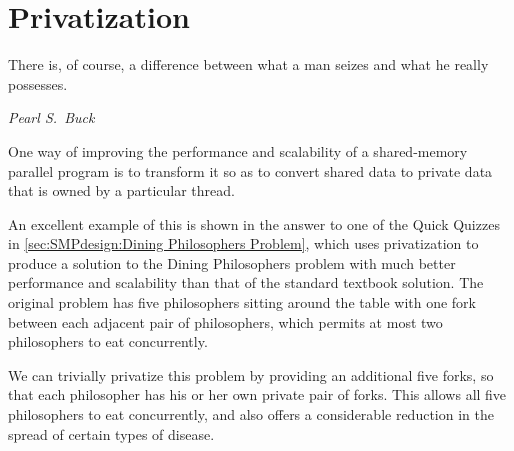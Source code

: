 \QuickQuizEnd

\section{Privatization}
\label{sec:owned:Privatization}
%
\epigraph{There is, of course, a difference between what a man seizes
	  and what he really possesses.}
	 {\emph{Pearl S.~Buck}}

One way of improving the performance and scalability of a shared-memory
parallel program is to transform it so as to convert shared data to
private data that is owned by a particular thread.

An excellent example of this is shown in the answer to one of the
Quick Quizzes in
\cref{sec:SMPdesign:Dining Philosophers Problem},
which uses privatization to produce a solution to the
Dining Philosophers problem with much better performance and scalability
than that of the standard textbook solution.
The original problem has five philosophers sitting around the table
with one fork between each adjacent pair of philosophers, which permits
at most two philosophers to eat concurrently.

We can trivially privatize this problem by providing an additional five
forks, so that each philosopher has his or her own private pair of forks.
This allows all five philosophers to eat concurrently, and also offers
a considerable reduction in the spread of certain types of disease.

